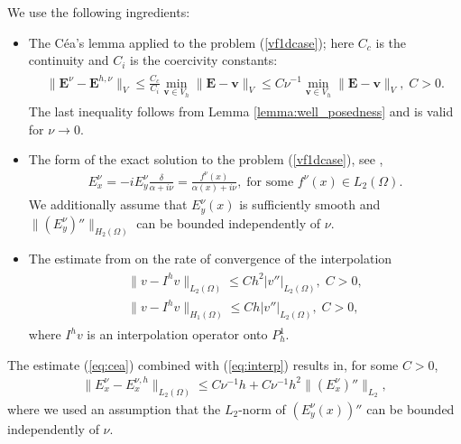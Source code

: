 We use the following ingredients:
\begin{itemize}
 \item The C\'ea's lemma applied to the problem (\ref{vf1dcase}); here $C_c$ is the continuity and $C_i$ is the coercivity constants:
\begin{align}
\label{eq:cea}
\begin{split}
 \|\mathbf{E}^{\nu}-\mathbf{E}^{h,\nu}\|_{V}\leq \frac{C_c}{C_i}\min_{\mathbf{v}\in V_h}\|\mathbf{E}-\mathbf{v}\|_{V}
 \leq C\nu^{-1}\min_{\mathbf{v}\in V_h}\|\mathbf{E}-\mathbf{v}\|_{V},\; C>0.
 \end{split}
\end{align}
The last inequality follows from Lemma \ref{lemma:well_posedness} and is valid for $\nu\rightarrow 0$.   
\item The form of the exact solution to the problem (\ref{vf1dcase}), see \cite{Despres_2014},
\begin{align}
\label{eq:exact}
 E_x^{\nu}=-iE_{y}^{\nu}\frac{\delta}{\alpha+i\nu}=\frac{f^{\nu}(x)}{\alpha(x)+i\nu}, \; \text{for some }f^{\nu}(x)\in L_{2}(\Omega).
\end{align}
We additionally assume that $E_y^{\nu}(x)$ is sufficiently smooth and $\|(E_y^{\nu})''\|_{H_{2}(\Omega)}$
can be bounded independently of $\nu$. 
\item The estimate from \cite[Chapter 0]{brenner} on the rate of convergence of the interpolation 
\begin{align}
\label{eq:interp}
\begin{split}
 \|v-I^{h}v\|_{L_{2}(\Omega)}\leq Ch^2\left|v''\right|_{L_{2}(\Omega)},\; C>0,\\
 \|v-I^{h}v\|_{H_{1}(\Omega)}\leq Ch|v''|_{L_{2}(\Omega)},\; C>0, 
 \end{split}
\end{align}
where $I^{h}v$ is an interpolation operator onto $P_{h}^{1}$. 
\end{itemize}
The estimate (\ref{eq:cea}) combined with (\ref{eq:interp}) results in, for some $C>0$,
\begin{align}
  \label{eq:final_est}
  \|E^{\nu}_{x}-E^{\nu,h}_{x}\|_{L_{2}(\Omega)}%
  \leq C\nu^{-1}h+C\nu^{-1}h^2\|\left(E_x^{\nu}\right)''\|_{L_{2}},
\end{align}
where we used an assumption that the $L_2$-norm of $\left(E_y^{\nu}(x)\right)''$ can be bounded independently of $\nu$.

